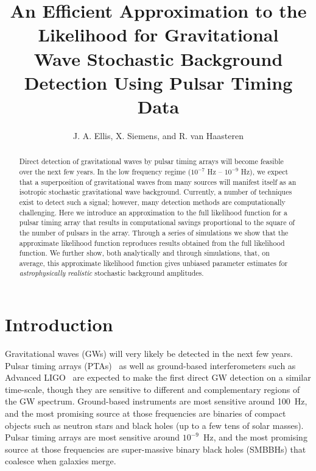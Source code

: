 \documentclass[iop]{emulateapj} \usepackage{apjfonts}
\begin{document}
\title{An Efficient Approximation to the Likelihood for
Gravitational\\ Wave Stochastic Background Detection Using Pulsar
Timing Data}

\author{J. A. Ellis, X. Siemens, and
R. van Haasteren}



\begin{abstract} 
Direct detection of gravitational waves by pulsar
timing arrays will become feasible over the next few years. In the low
frequency regime ($10^{-7}$ Hz -- $10^{-9}$ Hz), we expect that a
superposition of gravitational waves from many sources will manifest
itself as an isotropic stochastic gravitational wave background.
Currently, a number of techniques exist to detect such a signal;
however, many detection methods are computationally challenging. Here
we introduce an approximation to the full likelihood function for a
pulsar timing array that results in computational savings proportional
to the square of the number of pulsars in the array. Through a series
of simulations we show that the approximate likelihood function
reproduces results obtained from the full likelihood function. We
further show, both analytically and through simulations, that, on
average, this approximate likelihood function gives unbiased parameter
estimates for \emph{astrophysically} \emph{realistic} stochastic
background amplitudes. 
\end{abstract}

\maketitle

\section{Introduction}

Gravitational waves (GWs) will very likely be detected in the next few
years. Pulsar timing arrays (PTAs)~\citep{haa+10} as well as
ground-based interferometers such as Advanced
LIGO~\citep{Waldman:2011vg} are expected to make the first direct GW
detection on a similar time-scale, though they are sensitive to
different and complementary regions of the GW spectrum. Ground-based
instruments are most sensitive around 100~Hz, and the most promising
source at those frequencies are binaries of compact objects such as
neutron stars and black holes (up to a few tens of solar masses).
Pulsar timing arrays are most sensitive around $10^{-9}$~Hz, and the
most promising source at those frequencies are super-massive binary
black holes (SMBBHs) that coalesce when galaxies merge.
\end{document}
